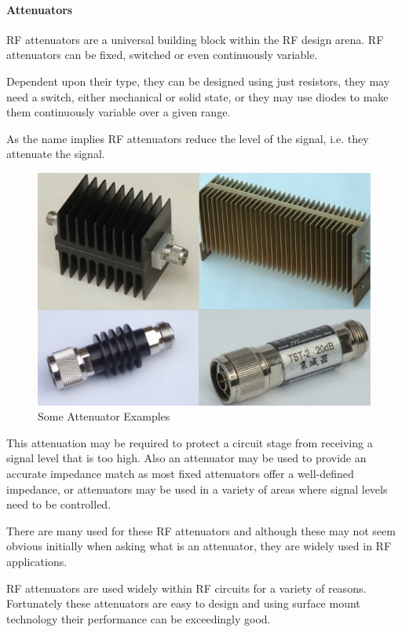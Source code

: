\paragraph{Attenuators} 
\- \indent
	RF attenuators are a universal building block within the RF design arena. RF attenuators can be fixed, switched or even continuously variable.

Dependent upon their type, they can be designed using just resistors, they may need a switch, either mechanical or solid state, or they may use diodes to make them continuously variable over a given range.

	As the name implies RF attenuators reduce the level of the signal, i.e. they attenuate the signal.

\begin{figure}[H]
	\center
	\setlength{\unitlength}{\textwidth} 
	\includegraphics[width=0.5\unitlength]{attn}
	\caption{\label{fig:attn}Some Attenuator Examples }
\end{figure}

	This attenuation may be required to protect a circuit stage from receiving a signal level that is too high. Also an attenuator may be used to provide an accurate impedance match as most fixed attenuators offer a well-defined impedance, or attenuators may be used in a variety of areas where signal levels need to be controlled.

	There are many used for these RF attenuators and although these may not seem obvious initially when asking what is an attenuator, they are widely used in RF applications.


RF attenuators are used widely within RF circuits for a variety of reasons. Fortunately these attenuators are easy to design and using surface mount technology their performance can be exceedingly good.


